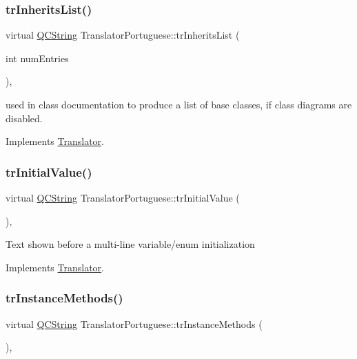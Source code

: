 \subsubsection{\texorpdfstring{trInheritsList()}{trInheritsList()}}
{\footnotesize\ttfamily virtual \mbox{\hyperlink{class_q_c_string}{Q\+C\+String}} Translator\+Portuguese\+::tr\+Inherits\+List (\begin{DoxyParamCaption}\item[{int}]{num\+Entries }\end{DoxyParamCaption})\hspace{0.3cm}{\ttfamily [inline]}, {\ttfamily [virtual]}}

used in class documentation to produce a list of base classes, if class diagrams are disabled. 

Implements \mbox{\hyperlink{class_translator}{Translator}}.

\mbox{\label{class_translator_portuguese_a500c0b21a92bf7c6c3e7fc6a5a55fc7e}} 
\subsubsection{\texorpdfstring{trInitialValue()}{trInitialValue()}}
{\footnotesize\ttfamily virtual \mbox{\hyperlink{class_q_c_string}{Q\+C\+String}} Translator\+Portuguese\+::tr\+Initial\+Value (\begin{DoxyParamCaption}{ }\end{DoxyParamCaption})\hspace{0.3cm}{\ttfamily [inline]}, {\ttfamily [virtual]}}

Text shown before a multi-\/line variable/enum initialization 

Implements \mbox{\hyperlink{class_translator}{Translator}}.

\mbox{\label{class_translator_portuguese_aa4f928e964e1f5df0b7740c6dd28b186}} 
\subsubsection{\texorpdfstring{trInstanceMethods()}{trInstanceMethods()}}
{\footnotesize\ttfamily virtual \mbox{\hyperlink{class_q_c_string}{Q\+C\+String}} Translator\+Portuguese\+::tr\+Instance\+Methods (\begin{DoxyParamCaption}{ }\end{DoxyParamCaption})\hspace{0.3cm}{\ttfamily [inline]}, {\ttfamily [virtual]}}

